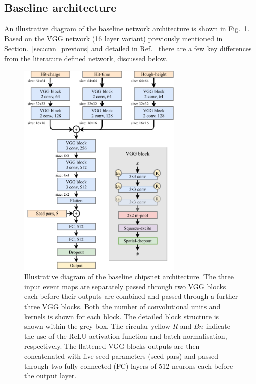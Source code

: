 \subsection{Baseline architecture} %
\label{sec:cnn_baseline_arch} %

An illustrative diagram of the baseline network architecture is shown in Fig.~\ref{fig:chipsnet}.
Based on the VGG network (16 layer variant) previously mentioned in
Section.~\ref{sec:cnn_previous} and detailed in Ref.~\cite{simonyan2014} there are a few key
differences from the literature defined network, discussed below.

\begin{figure} %
    \includegraphics[width=0.7\textwidth]{diagrams/6-cnn/chipsnet.pdf}
    \caption[Illustrative diagram of the baseline chipsnet architecture]
    {Illustrative diagram of the baseline chipsnet architecture. The three input event maps are
        separately passed through two VGG blocks each before their outputs are combined and passed
        through a further three VGG blocks. Both the number of convolutional units and kernels is
        shown for each block. The detailed block structure is shown within the grey box. The
        circular yellow $R$ and $Bn$ indicate the use of the ReLU activation function and batch
        normalisation, respectively. The flattened VGG blocks outputs are then concatenated with
        five seed parameters (seed pars) and passed through two fully-connected (FC) layers of 512
        neurons each before the output layer.}
    \label{fig:chipsnet}
\end{figure}

